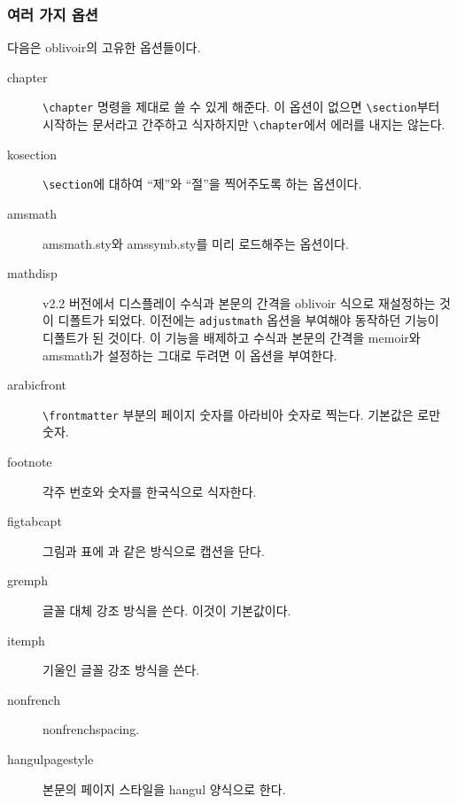 \documentclass[
	12pt,
	a4paper,
	kosection,
	footnote,
	nobookmarks,
	microtype,
]{oblivoir}
\newcommand\obclass{ob\-liv\-oir\oblivoirallowbreak}
\begin{document}
\subsubsection{여러 가지 옵션}

다음은 \obclass 의 고유한 옵션들이다. 
\begin{description}
\item [chapter] \verb|\chapter| 명령을 제대로 쓸 수 있게 해준다. 이 옵션이 없으면  \verb|\section|부터 시작하는 문서라고 간주하고 식자하지만 \verb|\chapter|에서 에러를 내지는 않는다.
\item [kosection] \verb|\section|에 대하여 ``제''와 ``절''을 찍어주도록 하는 옵션이다.
\item [amsmath] amsmath.sty와 amssymb.sty를 미리 로드해주는 옵션이다.
\item [mathdisp] v2.2 버전에서 디스플레이 수식과 본문의 간격을 oblivoir 식으로 재설정하는 것이 디폴트가 되었다. 이전에는 \verb|adjustmath| 옵션을 부여해야 동작하던 기능이 디폴트가 된 것이다. 이 기능을 배제하고 수식과 본문의 간격을 memoir와 amsmath가 설정하는 그대로 두려면 이 옵션을 부여한다.
\item [arabicfront] \verb|\frontmatter| 부분의 페이지 숫자를 아라비아 숫자로 찍는다. 기본값은 로만 숫자.
\item [footnote] 각주 번호와 숫자를 한국식으로 식자한다.
\item [figtabcapt] 그림과 표에 과 같은 방식으로 캡션을 단다.
\item [gremph] 글꼴 대체 강조 방식을 쓴다. 이것이 기본값이다.
\item [itemph] 기울인 글꼴 강조 방식을 쓴다.
\item [nonfrench] nonfrenchspacing.
\item [hangulpagestyle] 본문의 페이지 스타일을 hangul 양식으로 한다.

\end{description}
\end{document}
